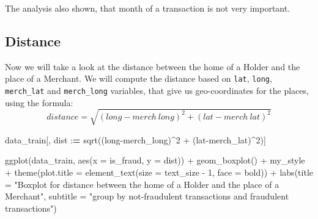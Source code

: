 \documentclass[
]{report}
\newenvironment{Shaded}{\begin{snugshade}}{\end{snugshade}}
\newcommand{\AttributeTok}[1]{\textcolor[rgb]{0.77,0.63,0.00}{#1}}
\newcommand{\DecValTok}[1]{\textcolor[rgb]{0.00,0.00,0.81}{#1}}
\newcommand{\ErrorTok}[1]{\textcolor[rgb]{0.64,0.00,0.00}{\textbf{#1}}}
\newcommand{\FunctionTok}[1]{\textcolor[rgb]{0.00,0.00,0.00}{#1}}
\newcommand{\NormalTok}[1]{#1}
\newcommand{\SpecialCharTok}[1]{\textcolor[rgb]{0.00,0.00,0.00}{#1}}
\newcommand{\StringTok}[1]{\textcolor[rgb]{0.31,0.60,0.02}{#1}}
\begin{document}
The analysis also shown, that month of a transaction is not very
important.

\hypertarget{distance}{%
\subsection{Distance}\label{distance}}

Now we will take a look at the distance between the home of a Holder and
the place of a Merchant. We will compute the distance based on
\texttt{lat}, \texttt{long}, \texttt{merch\_lat} and
\texttt{merch\_long} variables, that give us geo-coordinates for the
places, using the formula:
\[distance = \sqrt{(long-merch\ long)^2 + (lat-merch\ lat)^2}\]

\begin{Shaded}
\begin{Highlighting}[]
\NormalTok{data\_train[, dist }\SpecialCharTok{:}\ErrorTok{=} \FunctionTok{sqrt}\NormalTok{((long}\SpecialCharTok{{-}}\NormalTok{merch\_long)}\SpecialCharTok{\^{}}\DecValTok{2} \SpecialCharTok{+}\NormalTok{ (lat}\SpecialCharTok{{-}}\NormalTok{merch\_lat)}\SpecialCharTok{\^{}}\DecValTok{2}\NormalTok{)]}
\end{Highlighting}
\end{Shaded}

\begin{Shaded}
\begin{Highlighting}[]
\FunctionTok{ggplot}\NormalTok{(data\_train, }\FunctionTok{aes}\NormalTok{(}\AttributeTok{x =}\NormalTok{ is\_fraud, }\AttributeTok{y =}\NormalTok{ dist)) }\SpecialCharTok{+}
  \FunctionTok{geom\_boxplot}\NormalTok{() }\SpecialCharTok{+}
\NormalTok{  my\_style }\SpecialCharTok{+}
  \FunctionTok{theme}\NormalTok{(}\AttributeTok{plot.title =} \FunctionTok{element\_text}\NormalTok{(}\AttributeTok{size =}\NormalTok{ text\_size }\SpecialCharTok{{-}} \DecValTok{1}\NormalTok{, }\AttributeTok{face =} \StringTok{\textquotesingle{}bold\textquotesingle{}}\NormalTok{)) }\SpecialCharTok{+}
  \FunctionTok{labs}\NormalTok{(}\AttributeTok{title =} \StringTok{"Boxplot for distance between the home of a Holder and the place of a Merchant"}\NormalTok{,}
       \AttributeTok{subtitle =} \StringTok{"group by not{-}fraudulent transactions and fraudulent transactions"}\NormalTok{)}
\end{Highlighting}
\end{Shaded}
\end{document}
